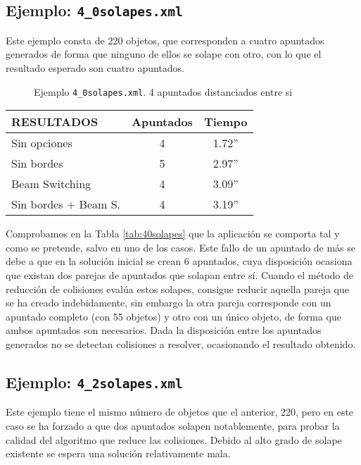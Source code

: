 \subsection {Ejemplo: \texttt{4\_0solapes.xml}}
Este ejemplo consta de 220 objetos, que corresponden a cuatro apuntados
generados de forma que ninguno de ellos se solape con otro, con lo que el
resultado esperado son cuatro apuntados.

\begin{figure}[!htb]
\centering
{}
\caption{Ejemplo \texttt{4\_0solapes.xml}. 4 apuntados distanciados entre si}
\end{figure}

\begin{table*}[!ht]
\centering
\begin{tabular}{||l||c|c||}
\hline
\hline
RESULTADOS & Apuntados & Tiempo \\
\hline
\hline
Sin opciones & 4 & 1.72'' \\
\hline
Sin bordes & 5& 2.97'' \\
\hline
Beam Switching & 4 & 3.09'' \\
\hline
Sin bordes + Beam S. & 4& 3.19'' \\
\hline
\hline
\end{tabular}
\caption{Resultados del ejemplo \texttt{4\_0solapes.xml}}
\label{tab:40solapes}
\end{table*}

Comprobamos en la Tabla \ref{tab:40solapes} que la aplicación se comporta tal y
como se pretende, salvo en uno de los casos. Este fallo de un apuntado de más se
debe a que en la solución inicial se crean 6 apuntados, cuya disposición
ocasiona que existan dos parejas de apuntados que solapan entre sí. Cuando el
método de reducción de colisiones evalúa estos solapes, consigue reducir aquella
pareja que se ha creado indebidamente, sin embargo la otra pareja corresponde
con un apuntado completo (con 55 objetos) y otro con un único objeto, de forma
que ambos apuntados son necesarios. Dada la disposición entre los apuntados
generados no se detectan colisiones a resolver, ocasionando el resultado
obtenido.
\subsection {Ejemplo: \texttt{4\_2solapes.xml}}
Este ejemplo tiene el mismo número de objetos que el anterior, 220, pero en este caso
se ha forzado a que dos apuntados solapen notablemente, para probar la calidad
del algoritmo que reduce las colisiones. Debido al alto grado de solape
existente se espera una solución relativamente mala.

